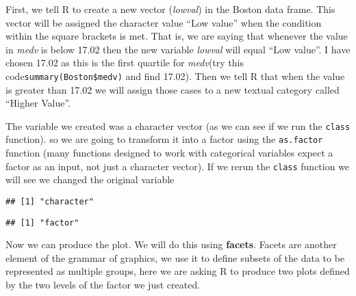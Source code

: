 \documentclass[
]{book}
\newenvironment{Shaded}{\begin{snugshade}}{\end{snugshade}}
\newcommand{\FunctionTok}[1]{\textcolor[rgb]{0.13,0.29,0.53}{\textbf{#1}}}
\newcommand{\NormalTok}[1]{#1}
\newcommand{\OtherTok}[1]{\textcolor[rgb]{0.56,0.35,0.01}{#1}}
\newcommand{\SpecialCharTok}[1]{\textcolor[rgb]{0.81,0.36,0.00}{\textbf{#1}}}
\begin{document}
First, we tell R to create a new vector (\emph{lowval}) in the Boston data frame. This vector will be assigned the character value ``Low value'' when the condition within the square brackets is met. That is, we are saying that whenever the value in \emph{medv} is below 17.02 then the new variable \emph{lowval} will equal ``Low value''. I have chosen 17.02 as this is the first quartile for \emph{medv}(try this code\texttt{summary(Boston\$medv)} and find 17.02). Then we tell R that when the value is greater than 17.02 we will assign those cases to a new textual category called ``Higher Value''.

The variable we created was a character vector (as we can see if we run the \texttt{class} function). so we are going to transform it into a factor using the \texttt{as.factor} function (many functions designed to work with categorical variables expect a factor as an input, not just a character vector). If we rerun the \texttt{class} function we will see we changed the original variable

\begin{Shaded}
\end{Shaded}

\begin{verbatim}
## [1] "character"
\end{verbatim}

\begin{Shaded}
\end{Shaded}

\begin{verbatim}
## [1] "factor"
\end{verbatim}

Now we can produce the plot. We will do this using \textbf{facets}. Facets are another element of the grammar of graphics, we use it to define subsets of the data to be represented as multiple groups, here we are asking R to produce two plots defined by the two levels of the factor we just created.
\end{document}
